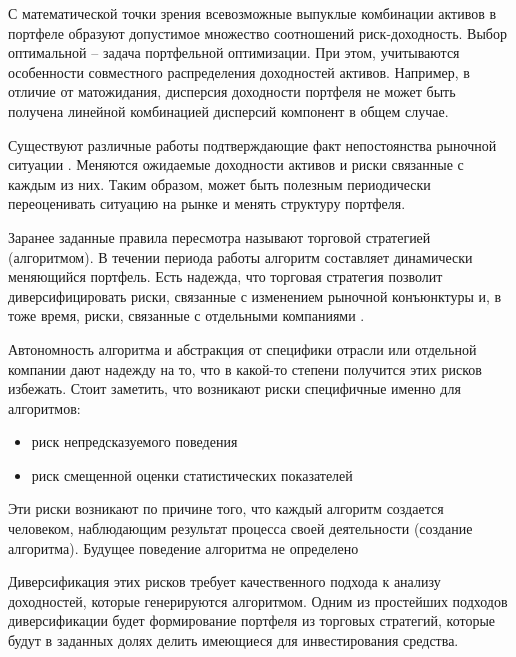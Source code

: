 С математической точки зрения всевозможные выпуклые комбинации активов в портфеле образуют допустимое множество соотношений риск-доходность. Выбор оптимальной -- задача портфельной оптимизации. При этом, учитываются особенности совместного распределения доходностей активов. Например, в отличие от матожидания, дисперсия доходности портфеля не может быть получена линейной комбинацией дисперсий компонент в общем случае. 

Существуют различные работы подтверждающие факт непостоянства рыночной ситуации \citep{billio2003, koutmos2012}. Меняются ожидаемые доходности активов и риски связанные с каждым из них. Таким образом, может быть полезным периодически переоценивать ситуацию на рынке и менять структуру портфеля. 

Заранее заданные правила пересмотра называют торговой стратегией (алгоритмом). В течении периода работы алгоритм составляет динамически меняющийся портфель. Есть надежда, что торговая стратегия позволит диверсифицировать риски, связанные с изменением рыночной конъюнктуры и, в тоже время, риски, связанные с отдельными компаниями \citep{lorenz2008thesis}. 

Автономность алгоритма и абстракция от специфики отрасли или отдельной компании дают надежду на то, что в какой-то степени получится этих рисков избежать. Стоит заметить, что возникают риски специфичные именно для алгоритмов:
\begin{itemize}
	\item риск непредсказуемого поведения
	\item риск смещенной оценки статистических показателей
\end{itemize}
Эти риски возникают по причине того, что каждый алгоритм создается человеком, наблюдающим результат процесса своей деятельности (создание алгоритма). Будущее поведение алгоритма не определено

Диверсификация этих рисков требует качественного подхода к анализу доходностей, которые генерируются алгоритмом. Одним из простейших подходов диверсификации будет формирование портфеля из торговых стратегий, которые будут в заданных долях делить имеющиеся для инвестирования средства.

